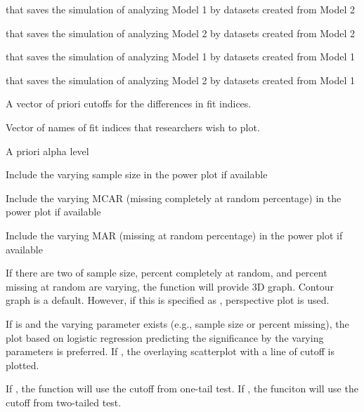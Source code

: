 \documentclass[a4paper]{book}
\begin{document}
\begin{Arguments}
\begin{ldescription}
\item[\code{dat2Mod1}] 
 that saves the simulation of analyzing Model 1 by datasets created from Model 2

\item[\code{dat2Mod2}] 
 that saves the simulation of analyzing Model 2 by datasets created from Model 2

\item[\code{dat1Mod1}] 
 that saves the simulation of analyzing Model 1 by datasets created from Model 1

\item[\code{dat1Mod2}] 
 that saves the simulation of analyzing Model 2 by datasets created from Model 1

\item[\code{cutoff}] 
A vector of priori cutoffs for the differences in fit indices.

\item[\code{usedFit}] 
Vector of names of fit indices that researchers wish to plot.

\item[\code{alpha}] 
A priori alpha level

\item[\code{contN}] 
Include the varying sample size in the power plot if available

\item[\code{contMCAR}] 
Include the varying MCAR (missing completely at random percentage) in the power plot if available

\item[\code{contMAR}] 
Include the varying MAR (missing at random percentage) in the power plot if available

\item[\code{useContour}] 
If there are two of sample size, percent completely at random, and percent missing at random are varying, the  function will provide 3D graph. Contour graph is a default. However, if this is specified as , perspective plot is used.

\item[\code{logistic}] 
If  is  and the varying parameter exists (e.g., sample size or percent missing), the plot based on logistic regression predicting the significance by the varying parameters is preferred. If , the overlaying scatterplot with a line of cutoff is plotted.

\item[\code{onetailed}] 
If , the function will use the cutoff from one-tail test. If , the funciton will use the cutoff from two-tailed test.

\end{ldescription}
\end{Arguments}
\end{document}
